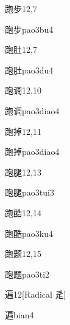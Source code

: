 \begin{entry}{跑步}{12,7}
  \begin{phonetics}{跑步}{pao3bu4}
  \end{phonetics}
\end{entry}

\begin{entry}{跑肚}{12,7}
  \begin{phonetics}{跑肚}{pao3du4}
  \end{phonetics}
\end{entry}

\begin{entry}{跑调}{12,10}
  \begin{phonetics}{跑调}{pao3diao4}
  \end{phonetics}
\end{entry}

\begin{entry}{跑掉}{12,11}
  \begin{phonetics}{跑掉}{pao3diao4}
  \end{phonetics}
\end{entry}

\begin{entry}{跑腿}{12,13}
  \begin{phonetics}{跑腿}{pao3tui3}
  \end{phonetics}
\end{entry}

\begin{entry}{跑酷}{12,14}
  \begin{phonetics}{跑酷}{pao3ku4}
  \end{phonetics}
\end{entry}

\begin{entry}{跑题}{12,15}
  \begin{phonetics}{跑题}{pao3ti2}
  \end{phonetics}
\end{entry}

\begin{entry}{遍}{12}[Radical 辵]
  \begin{phonetics}{遍}{bian4}
  \end{phonetics}
\end{entry}

